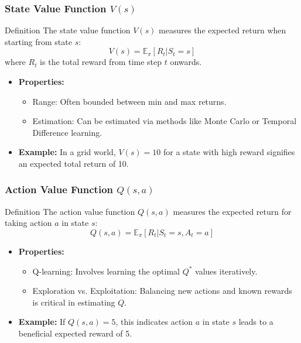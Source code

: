 \documentclass[aspectratio=169]{beamer}
\begin{document}
\begin{frame}[fragile]
    \frametitle{State Value Function \(V(s)\)}
    \begin{block}{Definition}
        The state value function \(V(s)\) measures the expected return when starting from state \(s\):
        \begin{equation}
        V(s) = \mathbb{E}_{\pi} \left[ R_t | S_t = s \right]
        \end{equation}
        where \(R_t\) is the total reward from time step \(t\) onwards.
    \end{block}
    
    \begin{itemize}
        \item \textbf{Properties:}
        \begin{itemize}
            \item Range: Often bounded between min and max returns.
            \item Estimation: Can be estimated via methods like Monte Carlo or Temporal Difference learning.
        \end{itemize}
        \item \textbf{Example:} In a grid world, \(V(s) = 10\) for a state with high reward signifies an expected total return of 10.
    \end{itemize}
\end{frame}

\begin{frame}[fragile]
    \frametitle{Action Value Function \(Q(s, a)\)}
    \begin{block}{Definition}
        The action value function \(Q(s, a)\) measures the expected return for taking action \(a\) in state \(s\):
        \begin{equation}
        Q(s, a) = \mathbb{E}_{\pi} \left[ R_t | S_t = s, A_t = a \right]
        \end{equation}
    \end{block}
    \begin{itemize}
        \item \textbf{Properties:}
        \begin{itemize}
            \item Q-learning: Involves learning the optimal \(Q^*\) values iteratively.
            \item Exploration vs. Exploitation: Balancing new actions and known rewards is critical in estimating \(Q\).
        \end{itemize}
        \item \textbf{Example:} If \(Q(s, a) = 5\), this indicates action \(a\) in state \(s\) leads to a beneficial expected reward of 5.
    \end{itemize}
\end{frame}
\end{document}
